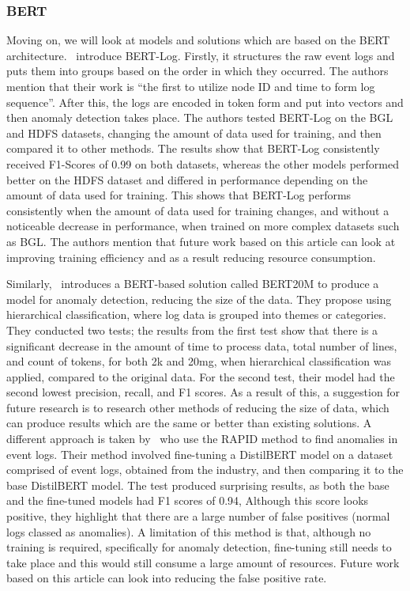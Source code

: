 \subsubsection{BERT}
Moving on, we will look at models and solutions which are based on the BERT architecture.~\cite{chen2022bert} introduce BERT-Log. Firstly, it structures the raw event logs and puts them into groups based on the order in which they occurred. The authors mention that their work is ``the first to utilize node ID and time to form log sequence''. After this, the logs are encoded in token form and put into vectors and then anomaly detection takes place. The authors tested BERT-Log on the BGL and HDFS datasets, changing the amount of data used for training, and then compared it to other methods. The results show that BERT-Log consistently received F1-Scores of 0.99 on both datasets, whereas the other models performed better on the HDFS dataset and differed in performance depending on the amount of data used for training. This shows that BERT-Log performs consistently when the amount of data used for training changes, and without a noticeable decrease in performance, when trained on more complex datasets such as BGL. The authors mention that future work based on this article can look at improving training efficiency and as a result reducing resource consumption. 

Similarly,~\cite{corbelle2024semantic} introduces a BERT-based solution called BERT20M to produce a model for anomaly detection, reducing the size of the data. They propose using hierarchical classification, where log data is grouped into themes or categories. They conducted two tests; the results from the first test show that there is a significant decrease in the amount of time to process data, total number of lines, and count of tokens, for both 2k and 20mg, when hierarchical classification was applied, compared to the original data. For the second test, their model had the second lowest precision, recall, and F1 scores. As a result of this, a suggestion for future research is to research other methods of reducing the size of data, which can produce results which are the same or better than existing solutions. A different approach is taken by~\cite{cometti2024real} who use the RAPID method to find anomalies in event logs. Their method involved fine-tuning a DistilBERT model on a dataset comprised of event logs, obtained from the industry, and then comparing it to the base DistilBERT model. The test produced surprising results, as both the base and the fine-tuned models had F1 scores of 0.94, Although this score looks positive, they highlight that there are a large number of false positives (normal logs classed as anomalies). A limitation of this method is that, although no training is required, specifically for anomaly detection, fine-tuning still needs to take place and this would still consume a large amount of resources. Future work based on this article can look into reducing the false positive rate. 

